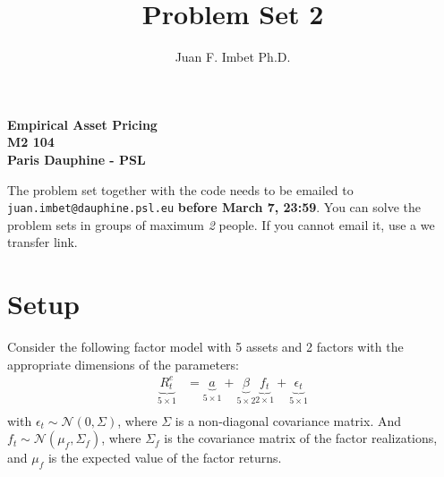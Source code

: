 \documentclass[a4paper,12pt]{article}
\title{Problem Set 2}
\author{Juan F. Imbet Ph.D.}
\date{}
\begin{document}
	
	\maketitle
	
	\begin{center}
		\textbf{Empirical Asset Pricing} \\
		\textbf{M2 104} \\
		\textbf{Paris Dauphine - PSL} \\
	\end{center}
	
	\noindent The problem set together with the code needs to be emailed to \texttt{juan.imbet@dauphine.psl.eu} \textbf{before March 7, 23:59}. You can solve the problem sets in groups of maximum \textit{2} people. If you cannot email it, use a we transfer link.
	
	\section*{Setup}
	
	Consider the following factor model with 5 assets and 2 factors with the appropriate dimensions of the parameters:
	\begin{align*}
		\underbrace{R_{t}^e}_{5 \times 1} &= \underbrace{a}_{5 \times 1} + \underbrace{\beta}_{5 \times 2} \underbrace{f_t}_{2 \times 1} + \underbrace{\epsilon_{t}}_{5 \times 1} \\
	\end{align*}
	with $\epsilon_t \sim \mathcal{N}(0, \Sigma)$, where $\Sigma$ is a non-diagonal covariance matrix. And $f_t \sim \mathcal{N}(\mu_f, \Sigma_f)$, where $\Sigma_f$ is the covariance matrix of the factor realizations, and $\mu_f$ is the expected value of the factor returns.
	
\end{document}
